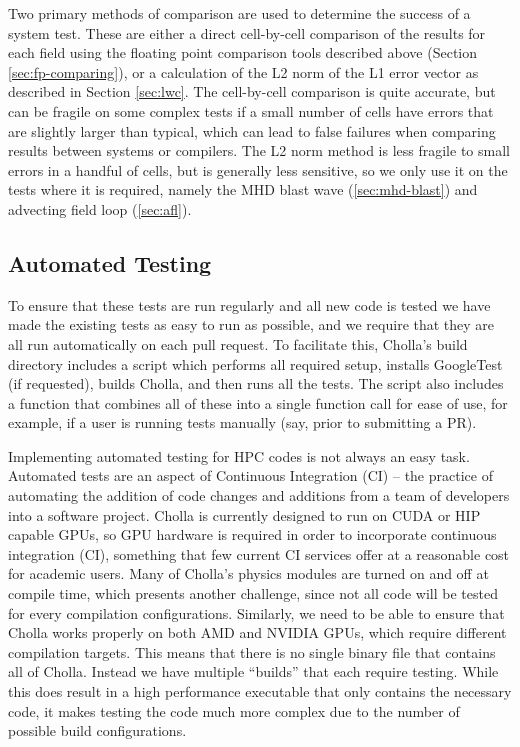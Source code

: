\documentclass[modern]{aastex631}
\begin{document}
Two primary methods of comparison are used to determine the success of a system test. These are either a direct cell-by-cell comparison of the results for each field using the floating point comparison tools described above (Section \ref{sec:fp-comparing}), or a calculation of the L2 norm of the L1 error vector as described in Section \ref{sec:lwc}. The cell-by-cell comparison is quite accurate, but can be fragile on some complex tests if a small number of cells have errors that are slightly larger than typical, which can lead to false failures when comparing results between systems or compilers. The L2 norm method is less fragile to small errors in a handful of cells, but is generally less sensitive, so we only use it on the tests where it is required, namely the MHD blast wave (\autoref{sec:mhd-blast}) and advecting field loop (\autoref{sec:afl}).

\subsection{Automated Testing}

To ensure that these tests are run regularly and all new code is tested we have made the existing tests as easy to run as possible, and we require that they are all run automatically on each pull request. To facilitate this, Cholla's build directory includes a script which performs all required setup, installs GoogleTest (if requested), builds Cholla, and then runs all the tests. The script also includes a function that combines all of these into a single function call for ease of use, for example, if a user is running tests manually (say, prior to submitting a PR).

Implementing automated testing for HPC codes is not always an easy task. Automated tests are an aspect of Continuous Integration (CI) -- the practice of automating the addition of code changes and additions from a team of developers into a software project. Cholla is currently designed to run on CUDA or HIP capable GPUs, so GPU hardware is required in order to incorporate continuous integration (CI), something that few current CI services offer at a reasonable cost for academic users. Many of Cholla's physics modules are turned on and off at compile time, which presents another challenge, since not all code will be tested for every compilation configurations. Similarly, we need to be able to ensure that Cholla works properly on both AMD and NVIDIA GPUs, which require different compilation targets. This means that there is no single binary file that contains all of Cholla. Instead we have multiple ``builds'' that each require testing. While this does result in a high performance executable that only contains the necessary code, it makes testing the code much more complex due to the number of possible build configurations.
\end{document}
